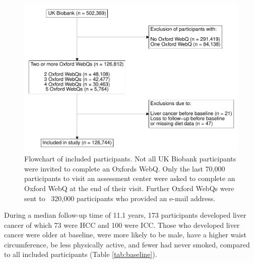 \documentclass[nutrients,article,submit,moreauthors,pdftex]{Definitions/mdpi}
\begin{document}
\begin{figure}

{\centering \includegraphics[width=1\linewidth,]{legliv-nutrients_files/figure-latex/fig1-1} 

}

\caption{Flowchart of included participants. Not all UK Biobank participants were invited to complete an Oxfords WebQ. Only the last 70,000 participants to visit an assessment center were asked to complete an Oxford WebQ at the end of their visit. Further Oxford WebQs were sent to ~320,000 participants who provided an e-mail address.}\label{fig:fig1}
\end{figure}

During a median follow-up time of 11.1 years, 173 participants developed
liver cancer of which 73 were HCC and 100 were ICC. Those who developed
liver cancer were older at baseline, were more likely to be male, have a
higher waist circumference, be less physically active, and fewer had
never smoked, compared to all included participants (Table
\ref{tab:baseline}).
\end{document}
